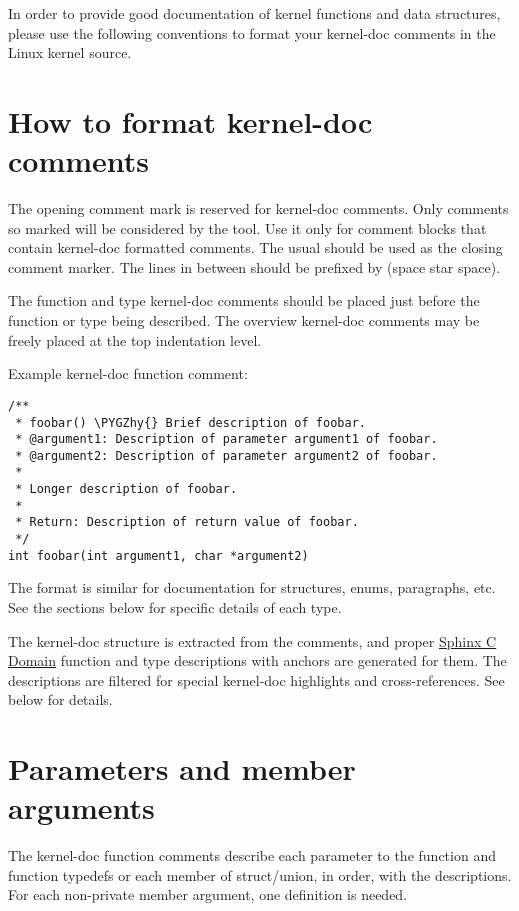 \documentclass[a4paper,8pt,english]{sphinxmanual}
\def\PYGZhy{\char`\-}
\begin{document}
In order to provide good documentation of kernel functions and data structures,
please use the following conventions to format your kernel-doc comments in the
Linux kernel source.


\section{How to format kernel-doc comments}
\label{doc-guide/kernel-doc:how-to-format-kernel-doc-comments}
The opening comment mark \code{/**} is reserved for kernel-doc comments. Only
comments so marked will be considered by the  tool. Use it only
for comment blocks that contain kernel-doc formatted comments. The usual \code{*/}
should be used as the closing comment marker. The lines in between should be
prefixed by \code{ * } (space star space).

The function and type kernel-doc comments should be placed just before the
function or type being described. The overview kernel-doc comments may be freely
placed at the top indentation level.

Example kernel-doc function comment:

\begin{Verbatim}[commandchars=\\\{\}]
/**
 * foobar() \PYGZhy{} Brief description of foobar.
 * @argument1: Description of parameter argument1 of foobar.
 * @argument2: Description of parameter argument2 of foobar.
 *
 * Longer description of foobar.
 *
 * Return: Description of return value of foobar.
 */
int foobar(int argument1, char *argument2)
\end{Verbatim}

The format is similar for documentation for structures, enums, paragraphs,
etc. See the sections below for specific details of each type.

The kernel-doc structure is extracted from the comments, and proper \href{http://www.sphinx-doc.org/en/stable/domains.html}{Sphinx C
Domain} function and type descriptions with anchors are generated for them. The
descriptions are filtered for special kernel-doc highlights and
cross-references. See below for details.


\section{Parameters and member arguments}
\label{doc-guide/kernel-doc:sphinx-c-domain}\label{doc-guide/kernel-doc:parameters-and-member-arguments}
The kernel-doc function comments describe each parameter to the function and
function typedefs or each member of struct/union, in order, with the
 descriptions. For each non-private member argument, one
 definition is needed.
\end{document}
